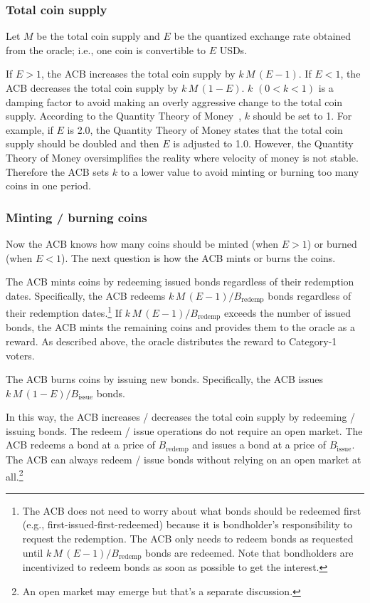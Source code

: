 \documentclass[dvipdfmx,a4paper]{article}
\begin{document}
\subsubsection{Total coin supply}

Let $M$ be the total coin supply and $E$ be the quantized exchange rate obtained from the oracle; i.e., one coin is convertible to $E$ USDs.

If $E>1$, the ACB increases the total coin supply by $k\,M\,(E-1)$. If $E<1$, the ACB decreases the total coin supply by $k\,M\,(1-E)$. $k$ $(0<k<1)$ is a damping factor to avoid making an overly aggressive change to the total coin supply. According to the Quantity Theory of Money~\cite{mankiwmacro}, $k$ should be set to 1. For example, if $E$ is 2.0, the Quantity Theory of Money states that the total coin supply should be doubled and then $E$ is adjusted to 1.0. However, the Quantity Theory of Money oversimplifies the reality where velocity of money is not stable. Therefore the ACB sets $k$ to a lower value to avoid minting or burning too many coins in one period.

\subsubsection{Minting / burning coins}

Now the ACB knows how many coins should be minted (when $E>1$) or burned (when $E<1$). The next question is how the ACB mints or burns the coins.

The ACB mints coins by redeeming issued bonds regardless of their redemption dates. Specifically, the ACB redeems $k\,M\,(E-1)/B_{\mathrm{redemp}}$ bonds regardless of their redemption dates.\footnote{The ACB does not need to worry about what bonds should be redeemed first (e.g., first-issued-first-redeemed) because it is bondholder's responsibility to request the redemption. The ACB only needs to redeem bonds as requested until $k\,M\,(E-1)/B_{\mathrm{redemp}}$ bonds are redeemed. Note that bondholders are incentivized to redeem bonds as soon as possible to get the interest.} If $k\,M\,(E-1)/B_{\mathrm{redemp}}$ exceeds the number of issued bonds, the ACB mints the remaining coins and provides them to the oracle as a reward. As described above, the oracle distributes the reward to Category-1 voters.

The ACB burns coins by issuing new bonds. Specifically, the ACB issues $k\,M\,(1-E)/B_{\mathrm{issue}}$ bonds.

In this way, the ACB increases / decreases the total coin supply by redeeming / issuing bonds. The redeem / issue operations do not require an open market. The ACB redeems a bond at a price of $B_{\mathrm{redemp}}$ and issues a bond at a price of $B_{\mathrm{issue}}$. The ACB can always redeem / issue bonds without relying on an open market at all.\footnote{An open market may emerge but that's a separate discussion.}
\end{document}
